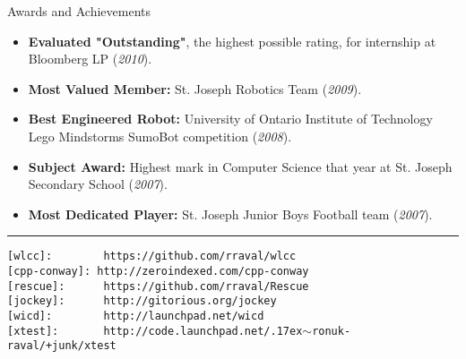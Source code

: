 \documentclass[11pt,oneside]{article}
\newcommand{\respara}[1]{
    \vspace{4pt}
    {\fontfamily{phv} \selectfont \Large #1} \\
    \vspace{4pt}
    \hspace{19pt}
}
\newenvironment{ressection}[1]{
    \respara{#1}
    \begin{itemize}
    \vspace{-20pt}
}{
    \end{itemize}
}
\newcommand{\resitem}[1]{
    \vspace{-4pt}
    \item \begin{flushleft} #1 \end{flushleft}
}
\newcommand{\ressubitem}[1]{
    \vspace{-1pt}
    \item \begin{flushleft} #1 \end{flushleft}
}
\newcommand{\resbigitem}[3]{
    \item
    \textbf{#1} \hfill \textit{#2} \\
    #3
}
\newenvironment{ressubsec}[3]{
    \resbigitem{#1}{#2}{#3}
    \vspace{-2pt}
    \begin{itemize}
    \vspace{-1.7em}
}{
    \end{itemize}
}
\begin{document}
%
%
%
%
%
%
%
%

\begin{ressection}{Awards and Achievements}

    \resitem{\textbf{Evaluated "Outstanding"}, the highest possible rating, for
        internship at Bloomberg LP (\textit{2010}).}

    \resitem{\textbf{Most Valued Member:} St. Joseph Robotics Team
        (\textit{2009}).}

    \resitem{\textbf{Best Engineered Robot:} University of Ontario Institute of Technology Lego
      Mindstorms SumoBot competition (\textit{2008}).}

    \resitem{\textbf{Subject Award:} Highest mark in Computer Science that year
        at St. Joseph Secondary School (\textit{2007}).}

    \resitem{\textbf{Most Dedicated Player:} St. Joseph Junior Boys Football
        team (\textit{2007}).}

\end{ressection}

\vfill

\rule{\textwidth}{1pt}
\begin{tabbing}
  \texttt{[wlcc]:\ \ \ \ \ \ \ \ https://github.com/rraval/wlcc}\\
  \texttt{[cpp-conway]: http://zeroindexed.com/cpp-conway}\\
  \texttt{[rescue]:\ \ \ \ \ \ https://github.com/rraval/Rescue}\\
  \texttt{[jockey]:\ \ \ \ \ \ http://gitorious.org/jockey}\\
  \texttt{[wicd]:\ \ \ \ \ \ \ \ http://launchpad.net/wicd}\\
  \texttt{[xtest]:\ \ \ \ \ \ \ http://code.launchpad.net/{\raise.17ex\hbox{$\scriptstyle\mathtt{\sim}$}}ronuk-raval/+junk/xtest}
\end{tabbing}
\end{document}
